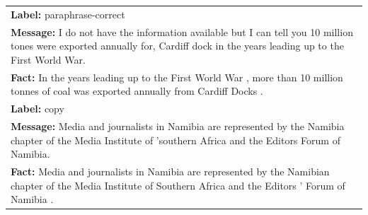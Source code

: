\begin{table}
    \small
    \centering
    \begin{tabular}{p{15cm}}
        \toprule
        \textbf{Label:} paraphrase-correct                                                                                                                                                                                                                                                                                                                                                                           \\
        \textbf{Message:} I do not have the information available but I can tell you 10 million tones were exported annually for, Cardiff dock in the years leading up to the First World War.                                                                                                                                                                                                                       \\
        \textbf{Fact:} In the years leading up to the First World War , more than 10 million tonnes of coal was exported annually from Cardiff Docks .                                                                                                                                                                                                                                                               \\
        \midrule
        \textbf{Label:} copy                                                                                                                                                                                                                                                                                                                                                                                         \\
        \textbf{Message:} Media and journalists in Namibia are represented by the Namibia chapter of the Media Institute of 'southern Africa and the Editors Forum of Namibia.                                                                                                                                                                                                                                       \\
        \textbf{Fact:} Media and journalists in Namibia are represented by the Namibian chapter of the Media Institute of Southern Africa and the Editors ' Forum of Namibia .                                                                                                                                                                                                                                       \\

\end{tabular}
\end{table}
